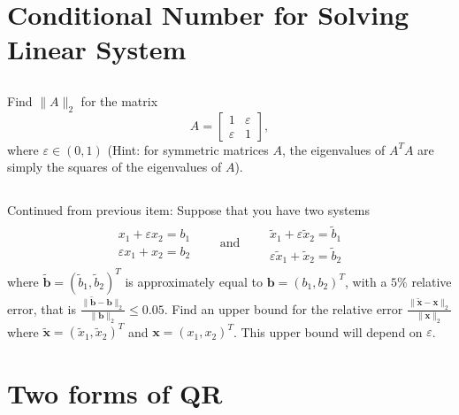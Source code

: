 \documentclass[11pt,letterpaper]{article}
\begin{document}
\section{Conditional Number for Solving Linear System}  
\subsection{}
Find $\|{A}\|_2$ for the matrix 
\[
A = \begin{bmatrix} 1 & \varepsilon \\ \varepsilon & 1 \end{bmatrix},
\]where $\varepsilon \in (0,1)$ (Hint: for symmetric matrices $A$, the
eigenvalues of $A^T A$ are simply the squares of the eigenvalues of
$A$).

\subsection{}
Continued from previous item: Suppose that you have two systems
\begin{align*}
\begin{matrix}
x_1 + \varepsilon x_2 = b_1 \\
 \varepsilon x_1 + x_2 = b_2  
\end{matrix}\qquad \text{and}\qquad
\begin{matrix}
\tilde x_1 + \varepsilon \tilde x_2 = \tilde b_1 \\
 \varepsilon \tilde x_1 + \tilde x_2 = \tilde b_2
\end{matrix}
\end{align*}
where $\tilde{\boldsymbol b} = (\tilde b_1, \tilde b_2)^T$ is
approximately equal to ${\boldsymbol b}=( b_1, b_2)^T$, with a $5\%$
relative error, that is $\frac{\|{\tilde {\boldsymbol b} -
    {\boldsymbol b}}\|_2}{\|{{\boldsymbol b}}\|_2} \leq 0.05$.  Find
an upper bound for the relative error $\frac{\|\tilde {\boldsymbol x}
  - {\boldsymbol x}\|_2}{\|{\boldsymbol x}\|_2}$ where $\tilde
{\boldsymbol x} = (\tilde x_1, \tilde x_2)^T$ and ${\boldsymbol x} =
(x_1,x_2)^T$. This upper bound will depend on $\varepsilon$.

\section{Two forms of QR}
\end{document}
